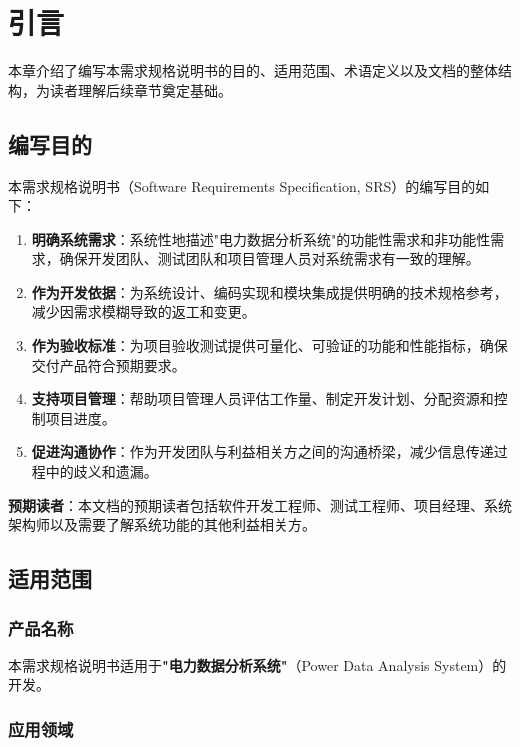 \chapter{引言}

本章介绍了编写本需求规格说明书的目的、适用范围、术语定义以及文档的整体结构，为读者理解后续章节奠定基础。

\section{编写目的}

本需求规格说明书（Software Requirements Specification, SRS）的编写目的如下：

\begin{enumerate}
    \item \textbf{明确系统需求}：系统性地描述"电力数据分析系统"的功能性需求和非功能性需求，确保开发团队、测试团队和项目管理人员对系统需求有一致的理解。

    \item \textbf{作为开发依据}：为系统设计、编码实现和模块集成提供明确的技术规格参考，减少因需求模糊导致的返工和变更。

    \item \textbf{作为验收标准}：为项目验收测试提供可量化、可验证的功能和性能指标，确保交付产品符合预期要求。

    \item \textbf{支持项目管理}：帮助项目管理人员评估工作量、制定开发计划、分配资源和控制项目进度。

    \item \textbf{促进沟通协作}：作为开发团队与利益相关方之间的沟通桥梁，减少信息传递过程中的歧义和遗漏。
\end{enumerate}

\textbf{预期读者}：本文档的预期读者包括软件开发工程师、测试工程师、项目经理、系统架构师以及需要了解系统功能的其他利益相关方。

\section{适用范围}

\subsection{产品名称}

本需求规格说明书适用于\textbf{"电力数据分析系统"}（Power Data Analysis System）的开发。

\subsection{应用领域}

